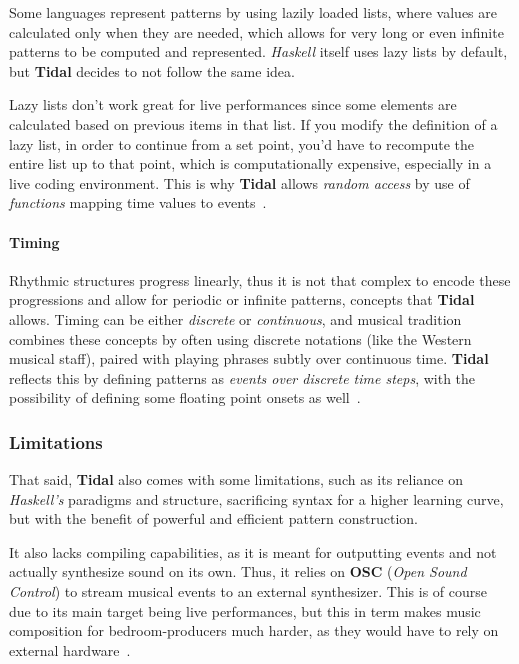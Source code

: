 Some languages represent patterns by using lazily loaded lists, where values are calculated only when they are needed,
which allows for very long or even infinite patterns to be computed and represented.
\textit{Haskell} itself uses lazy lists by default, but \textbf{Tidal} decides to not follow the same idea.

Lazy lists don't work great for live performances since some elements are calculated based on previous items in that
list.
If you modify the definition of a lazy list, in order to continue from a set point, you'd have to recompute
the entire list up to that point, which is computationally expensive, especially in a live coding environment.
This is why \textbf{Tidal} allows \textit{random access} by use of \textit{functions} mapping time values to
events~\cite{McLean_Wiggins_2010}.

\paragraph{Timing}

Rhythmic structures progress linearly, thus it is not that complex to encode these progressions and allow for periodic
or infinite patterns, concepts that \textbf{Tidal} allows.
Timing can be either \textit{discrete} or \textit{continuous}, and musical tradition combines these concepts by often
using discrete notations (like the Western musical staff), paired with playing phrases subtly over continuous time.
\textbf{Tidal} reflects this by defining patterns as \textit{events over discrete time steps}, with the possibility of
defining some floating point onsets as well~\cite{McLean_Wiggins_2010}.


\subsubsection{Limitations}

That said, \textbf{Tidal} also comes with some limitations, such as its reliance on \textit{Haskell's} paradigms and
structure, sacrificing syntax for a higher learning curve, but with the benefit of powerful and efficient pattern
construction.

It also lacks compiling capabilities, as it is meant for outputting events and not actually synthesize sound on its own.
Thus, it relies on \textbf{OSC} (\textit{Open Sound Control}) to stream musical events to an external synthesizer.
This is of course due to its main target being live performances, but this in term makes music composition
for bedroom-producers much harder, as they would have to rely on external hardware~\cite{McLean_Wiggins_2010}.

